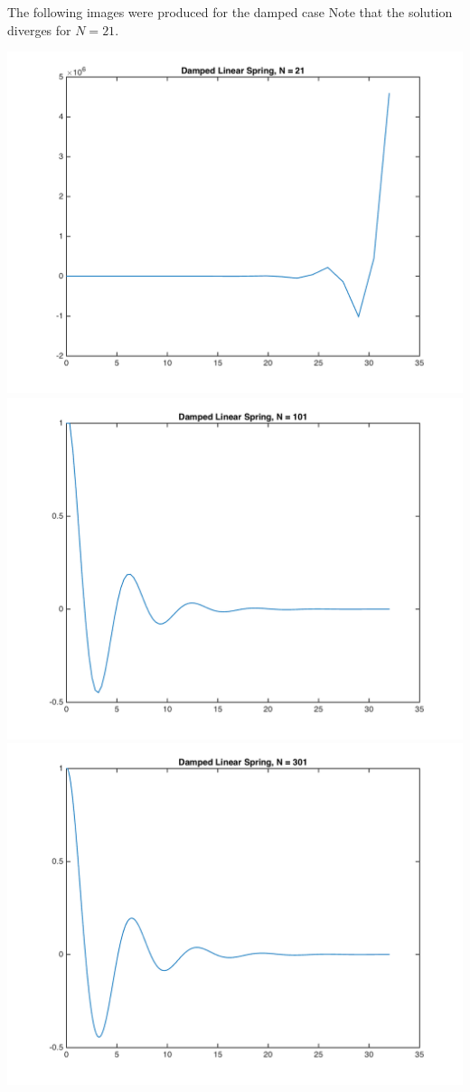 \documentclass[11pt, oneside]{article}
\begin{document}
\begin{enumerate}
    The following images were produced for the damped case
    Note that the solution diverges for $N = 21$.
    \begin{center}
      \includegraphics[scale=.4]{Figures/01_20.png}
      \includegraphics[scale=.4]{Figures/01_21.png}
      \includegraphics[scale=.4]{Figures/01_22.png}

\end{center}
\end{enumerate}
\end{document}
